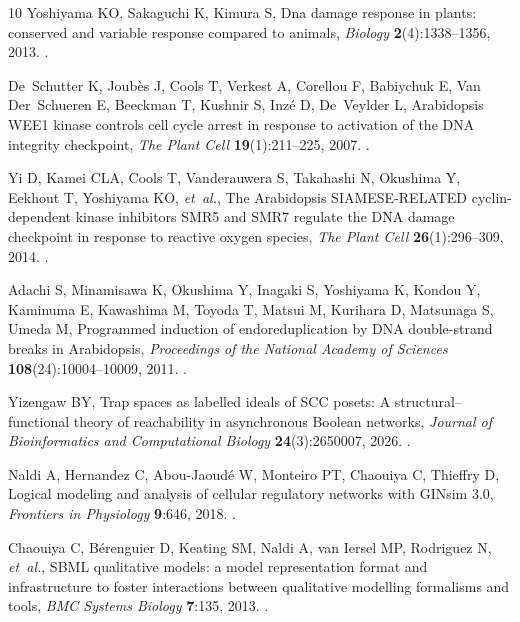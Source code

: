 \documentclass{ws-jbcb}
\numberwithin{equation}{section}
\begin{document}
\begin{thebibliography}{10}
Yoshiyama KO, Sakaguchi K, Kimura S, Dna damage response in plants: conserved
  and variable response compared to animals, \emph{Biology}
  \textbf{2}(4):1338--1356, 2013.
\newblock {}.

De~Schutter K, Joub{\`e}s J, Cools T, Verkest A, Corellou F, Babiychuk E, Van
  Der~Schueren E, Beeckman T, Kushnir S, Inz{\'e} D, De~Veylder L,
  {Arabidopsis} {WEE1} kinase controls cell cycle arrest in response to
  activation of the {DNA} integrity checkpoint, \emph{The Plant Cell}
  \textbf{19}(1):211--225, 2007.
\newblock {}.

Yi D, Kamei CLA, Cools T, Vanderauwera S, Takahashi N, Okushima Y, Eekhout T,
  Yoshiyama KO, \emph{et~al.}, The {Arabidopsis} {SIAMESE-RELATED}
  cyclin-dependent kinase inhibitors {SMR5} and {SMR7} regulate the {DNA}
  damage checkpoint in response to reactive oxygen species, \emph{The Plant
  Cell} \textbf{26}(1):296--309, 2014.
\newblock {}.

Adachi S, Minamisawa K, Okushima Y, Inagaki S, Yoshiyama K, Kondou Y, Kaminuma
  E, Kawashima M, Toyoda T, Matsui M, Kurihara D, Matsunaga S, Umeda M,
  Programmed induction of endoreduplication by {DNA} double-strand breaks in
  {Arabidopsis}, \emph{Proceedings of the National Academy of Sciences}
  \textbf{108}(24):10004--10009, 2011.
\newblock {}.

Yizengaw BY, Trap spaces as labelled ideals of {SCC} posets: A
  structural--functional theory of reachability in asynchronous {Boolean}
  networks, \emph{Journal of Bioinformatics and Computational Biology}
  \textbf{24}(3):2650007, 2026.
\newblock {}.

Naldi A, Hernandez C, Abou-Jaoud\'e W, Monteiro PT, Chaouiya C, Thieffry D,
  Logical modeling and analysis of cellular regulatory networks with {GINsim}
  3.0, \emph{Frontiers in Physiology} \textbf{9}:646, 2018.
\newblock {}.

Chaouiya C, B\'erenguier D, Keating SM, Naldi A, van Iersel MP, Rodriguez N,
  \emph{et~al.}, {SBML} qualitative models: a model representation format and
  infrastructure to foster interactions between qualitative modelling
  formalisms and tools, \emph{BMC Systems Biology} \textbf{7}:135, 2013.
\newblock {}.


\end{thebibliography}
\end{document}

